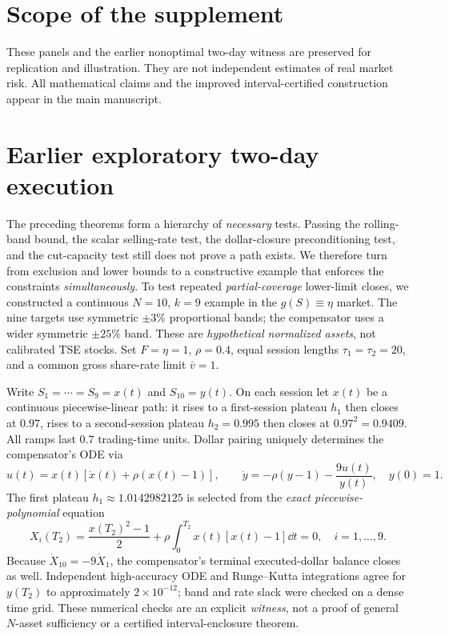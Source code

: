 \documentclass[review,supplement,hidelinks,onefignum,onetabnum]{siamonline250211}
\begin{document}
\maketitle
\section{Scope of the supplement}
These panels and the earlier nonoptimal two-day witness are preserved for replication and illustration. They are not independent estimates of real market risk. All mathematical claims and the improved interval-certified construction appear in the main manuscript.
\section{Earlier exploratory two-day execution}

The preceding theorems form a hierarchy of \emph{necessary} tests. Passing the rolling-band bound, the scalar selling-rate test, the dollar-closure preconditioning test, and the cut-capacity test still does not prove a path exists. We therefore turn from exclusion and lower bounds to a constructive example that enforces the constraints \emph{simultaneously}. To test repeated \emph{partial-coverage} lower-limit closes, we constructed a continuous $N=10$, $k=9$ example in the $g(S)\equiv\eta$ market. The nine targets use symmetric $\pm3\%$ proportional bands; the compensator uses a wider symmetric $\pm25\%$ band. These are \emph{hypothetical normalized assets}, not calibrated TSE stocks. Set $F=\eta=1$, $\rho=0.4$, equal session lengths $\tau_1=\tau_2=20$, and a common gross share-rate limit $\bar v=1$.

Write $S_1=\cdots=S_9=x(t)$ and $S_{10}=y(t)$. On each session let $x(t)$ be a continuous piecewise-linear path: it rises to a first-session plateau $h_1$ then closes at $0.97$, rises to a second-session plateau $h_2=0.995$ then closes at $0.97^2=0.9409$. All ramps last $0.7$ trading-time units. Dollar pairing uniquely determines the compensator's ODE via
\begin{equation}\label{eq:multiday-witness-ode}
 u(t)=x(t)[\dot x(t)+\rho(x(t)-1)],\qquad
 \dot y=-\rho(y-1)-\frac{9u(t)}{y(t)},\quad y(0)=1.
\end{equation}
The first plateau $h_1\approx1.0142982125$ is selected from the \emph{exact piecewise-polynomial} equation
\begin{equation}\label{eq:multiday-closed}
 X_i(T_2)=\frac{x(T_2)^2-1}{2}+\rho\int_0^{T_2}x(t)[x(t)-1]\dd t=0,
 \quad i=1,\ldots,9.
\end{equation}
Because $\dot X_{10}=-9\dot X_1$, the compensator's terminal executed-dollar balance closes as well. Independent high-accuracy ODE and Runge--Kutta integrations agree for $y(T_2)$ to approximately $2\times10^{-12}$; band and rate slack were checked on a dense time grid. These numerical checks are an explicit \emph{witness}, not a proof of general $N$-asset sufficiency or a certified interval-enclosure theorem.
\end{document}
